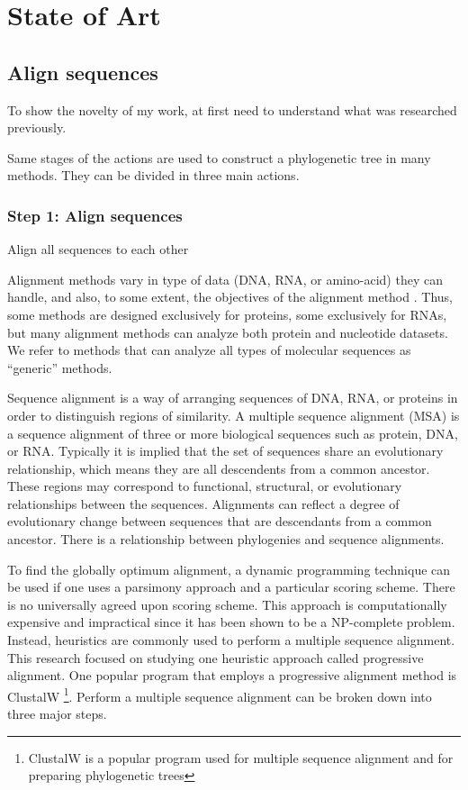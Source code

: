 \chapter{State of Art}
\section{Align sequences}
To show the novelty of my work, at first need to 
understand what was researched previously.

Same stages of the actions are used to construct a phylogenetic tree in many methods.
They can be divided in three main actions.

\subsection{Step 1: Align sequences} \label{phase1}

\begin{algorithm}[H]
{
	Align all sequences to each other\;
}
\end{algorithm}

\cite{rporter}

Alignment methods vary in type of data (DNA, RNA, or amino-acid)
they can handle, and also, to some extent, the objectives of the alignment method \cite{tandy}.
Thus, some methods are designed exclusively for proteins, some exclusively
for RNAs, but many alignment methods can analyze both protein and nucleotide
datasets. We refer to methods that can analyze all types of molecular sequences as
``generic'' methods.

Sequence alignment is a way of arranging sequences of DNA, RNA, or 
proteins in order to distinguish regions of similarity. A multiple sequence 
alignment (MSA) is a sequence alignment of three or more biological sequences 
such as protein, DNA, or RNA. Typically it is implied that the set of sequences 
share an evolutionary relationship, which means they are all descendents from a 
common ancestor. These regions may correspond to functional, structural, or 
evolutionary relationships between the sequences. Alignments can reflect a degree 
of evolutionary change between sequences that are descendants from a common 
ancestor. There is a relationship between phylogenies and sequence alignments.

To find the globally optimum alignment, a dynamic programming technique 
can be used if one uses a parsimony approach and a particular scoring scheme. 
There is no universally agreed upon scoring scheme. This approach is 
computationally expensive and impractical since it has been shown to be a NP-complete 
problem. Instead, heuristics are commonly used to perform a multiple 
sequence alignment. This research focused on studying one heuristic approach 
called progressive alignment. One popular program that employs a progressive 
alignment method is ClustalW \nocite{clustalw} \footnote{ClustalW is a popular 
program used for multiple sequence alignment and for preparing phylogenetic trees}. 
Perform a multiple sequence alignment can be broken down into three major steps.
\nocite{clustalwsite}

